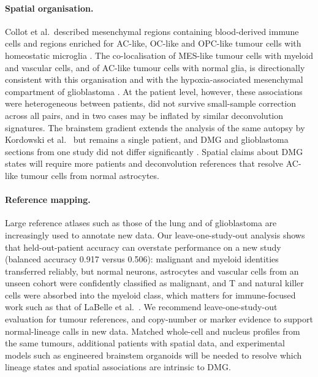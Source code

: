 \documentclass[11pt,a4paper]{article}
\begin{document}
\paragraph{Spatial organisation.} Collot et al.\ described mesenchymal regions containing blood-derived immune cells and
regions enriched for AC-like, OC-like and OPC-like tumour cells with homeostatic microglia \citep{collot2026igsfvista}.
The co-localisation of MES-like tumour cells with myeloid and vascular cells, and of AC-like tumour cells with normal
glia, is directionally consistent with this organisation and with the hypoxia-associated mesenchymal compartment of
glioblastoma \citep{neftel2019integrative,ruizmoreno2025gbmap}. At the patient level, however, these associations were
heterogeneous between patients, did not survive small-sample correction across all pairs, and in two cases may be
inflated by similar deconvolution signatures. The brainstem gradient extends the analysis of the same autopsy by Kordowski
et al.\ \citep{kordowski2025spatial} but remains a single patient, and DMG and glioblastoma sections from one study did
not differ significantly \citep{ren2023spatial}. Spatial claims about DMG states will require more patients and
deconvolution references that resolve AC-like tumour cells from normal astrocytes.

\paragraph{Reference mapping.} Large reference atlases such as those of the lung \citep{sikkema2023integrated} and of
glioblastoma \citep{ruizmoreno2025gbmap} are increasingly used to annotate new data. Our leave-one-study-out analysis
shows that held-out-patient accuracy can overstate performance on a new study (balanced accuracy 0.917 versus 0.506):
malignant and myeloid identities transferred reliably, but normal neurons, astrocytes and vascular cells from an unseen
cohort were confidently classified as malignant, and T and natural killer cells were absorbed into the myeloid class,
which matters for immune-focused work such as that of LaBelle et al.\ \citep{labelle2025dissecting}. We recommend
leave-one-study-out evaluation for tumour references, and copy-number or marker evidence to support normal-lineage calls
in new data. Matched whole-cell and nucleus profiles from the same tumours, additional patients with spatial data, and
experimental models such as engineered brainstem organoids \citep{bessler2026de} will be needed to resolve which
lineage states and spatial associations are intrinsic to DMG.
\end{document}
